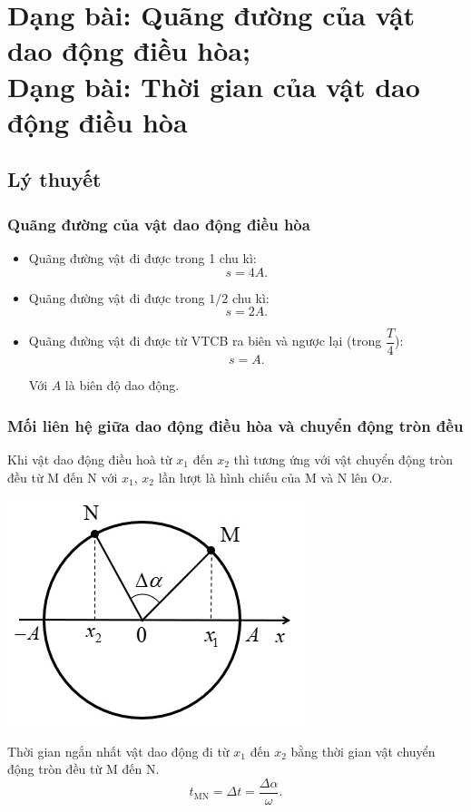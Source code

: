 
\chapter[Dạng bài: Quãng đường của vật\\ dao động điều hòa;\\Dạng bài: Thời gian của vật\\ dao động điều hòa]{Dạng bài: Quãng đường của vật dao động điều hòa;\\Dạng bài: Thời gian của vật dao động điều hòa}
\section{Lý thuyết}
\subsection{Quãng đường của vật dao động điều hòa}
\begin{itemize}
	\item Quãng đường vật đi được trong 1 chu kì:
	\begin{equation*}
		s=4A.
	\end{equation*}
	\item Quãng đường vật đi được trong $1/2$ chu kì:
	\begin{equation*}
		s=2A.
	\end{equation*}
	\item Quãng đường vật đi được từ VTCB ra biên và ngược lại (trong $\dfrac{T}{4}$):
	\begin{equation*}
		s=A.
	\end{equation*}
	
	Với $A$ là biên độ dao động.
\end{itemize}
\subsection{Mối liên hệ giữa dao động điều hòa và chuyển động tròn đều}

Khi vật dao động điều hoà từ $x_1$ đến $x_2$ thì tương ứng với vật chuyển động tròn đều từ M đến N với $x_1$, $x_2$ lần lượt là hình chiếu của M và N lên $\text{O}x$.
\begin{center}
	\includegraphics[scale=0.8]{../figs/VN12-PH-02-A-001-7-V2-1.jpg}
\end{center}
Thời gian ngắn nhất vật dao động đi từ $x_1$ đến $x_2$ bằng thời gian vật chuyển động tròn đều từ M đến N.
\begin{equation*}
	t_\text{MN}=\Delta t=\dfrac{\Delta\alpha}{\omega}.
\end{equation*}
